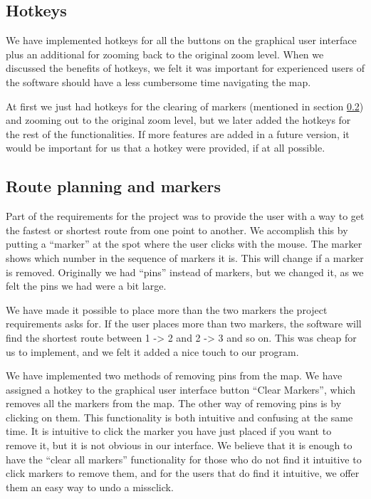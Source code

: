 \subsection{Hotkeys}
\label{UIA-IF-H}
We have implemented hotkeys for all the buttons on the graphical user interface
plus an additional for zooming back to the original zoom level. When we
discussed the benefits of hotkeys, we felt it was important for experienced users of the
software should have a less cumbersome time navigating the map. 

At first we just had hotkeys for the clearing of markers (mentioned in section
\ref{UIA-IF-M}) and zooming out to the original zoom level, but we later added
the hotkeys for the rest of the functionalities. If more features are added in a
future version, it would be important for us that a hotkey were provided, if at
all possible.

\subsection{Route planning and markers}
\label{UIA-IF-M}
Part of the requirements for the project was to provide the user with a way to
get the fastest or shortest route from one point to another. We accomplish this
by putting a ``marker'' at the spot where the user clicks with the mouse. The
marker shows which number in the sequence of markers it is. This will change 
if a marker is removed. Originally we had ``pins'' instead of markers, but we 
changed it, as we felt the pins we had were a bit large.

We have made it possible to place more than the two markers the project
requirements asks for. If the user places more than two markers, the software
will find the shortest route between 1 -> 2 and 2 -> 3 and so on. This was cheap for
us to implement, and we felt it added a nice touch to our program. 

We have implemented two methods of removing pins from the map. We have assigned
a hotkey to the graphical user interface button ``Clear Markers'', which removes 
all the markers from the map. The other way of removing pins is by clicking on
them. This functionality is both intuitive and confusing at the same time. It is
intuitive to click the marker you have just placed if you want to remove it, but
it is not obvious in our interface. We believe that it is enough to have the
``clear all markers'' functionality for those who do not find it intuitive to
click markers to remove them, and for the users that do find it intuitive, we
offer them an easy way to undo a missclick.

